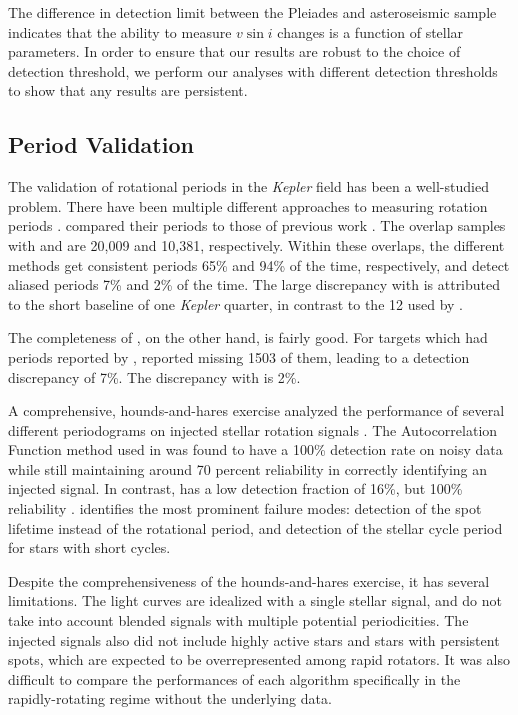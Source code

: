 \documentclass[manuscript]{aastex6}
\newcommand{\vsini}{\ensuremath{v \sin i}}
\newcommand{\Kepler}{\mbox{\textit{Kepler}}}
\begin{document}
The difference in detection limit between the Pleiades and asteroseismic sample
indicates that the ability to measure \vsini{} changes is a function of stellar
parameters. In order to ensure that our results are robust to the choice of
detection threshold, we
perform our analyses with different detection thresholds to show that any
results are persistent.

\subsection{Period Validation}

The validation of rotational periods in the \Kepler{} field has been a
well-studied problem. There have been multiple different approaches to
measuring rotation periods \citep{Reinhold13,Nielsen13,McQuillan14,Garcia14}.
\citet{McQuillan14} compared their periods to those of previous work
\citep{Reinhold13,Nielsen13}. The overlap samples with
\citet{Reinhold13} and \citet{Nielsen13} are 20,009 and 10,381,
respectively. Within these overlaps, the different methods get
consistent periods 65\% and 94\% of the time, respectively, and detect
aliased periods 7\% and 2\% of the time. The large discrepancy with
\citet{Reinhold13} is attributed to the short baseline of one \Kepler
quarter, in contrast to the 12 used by \citet{McQuillan14}.

The completeness of \citet{McQuillan14}, on the other hand, is fairly
good. For targets which had periods reported by \citet{Reinhold13},
\citet{McQuillan14} reported missing 1503 of them, leading to a detection
discrepancy of 7\%. The discrepancy with \citet{Nielsen13} is 2\%.

A comprehensive, hounds-and-hares exercise analyzed the performance of
several different periodograms on injected stellar rotation signals 
\citep{Aigrain15}. The Autocorrelation Function method used in 
\citet{McQuillan14} was found to have a 100\% detection rate on noisy
data while still maintaining around 70 percent reliability in correctly
identifying an injected signal. In contrast, \citet{Nielsen13} has a low
detection fraction of 16\%, but 100\% reliability \citep{Aigrain15}.
\citet{Aigrain15} identifies the most prominent failure modes: detection
of the spot lifetime instead of the rotational period, and detection of
the stellar cycle period for stars with short cycles.

Despite the comprehensiveness of the hounds-and-hares exercise, it has
several limitations. The light curves are idealized with a single
stellar signal, and do not take into account blended signals with
multiple potential periodicities. The injected signals also did not
include highly active stars and stars with persistent spots, which are
expected to be overrepresented among rapid rotators. It was also
difficult to compare the performances of each algorithm specifically in
the rapidly-rotating regime without the underlying data.
\end{document}
